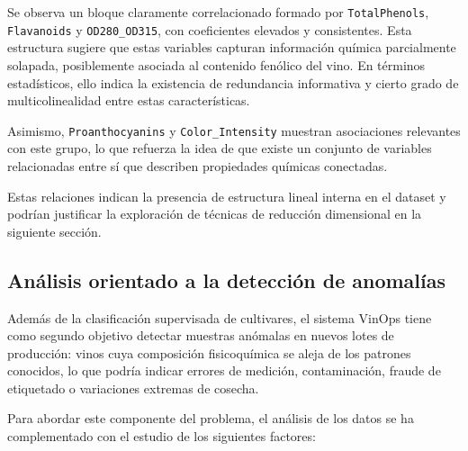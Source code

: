Se observa un bloque claramente correlacionado formado por 
\texttt{TotalPhenols}, \texttt{Flavanoids} y \texttt{OD280\_OD315}, 
con coeficientes elevados y consistentes. Esta estructura sugiere que 
estas variables capturan información química parcialmente solapada, 
posiblemente asociada al contenido fenólico del vino. En términos 
estadísticos, ello indica la existencia de redundancia informativa y 
cierto grado de multicolinealidad entre estas características.

Asimismo, \texttt{Proanthocyanins} y \texttt{Color\_Intensity} muestran 
asociaciones relevantes con este grupo, lo que refuerza la idea de que 
existe un conjunto de variables relacionadas entre sí que describen 
propiedades químicas conectadas. 

\vspace{1.5mm}

Estas relaciones indican la presencia de estructura lineal interna en
el dataset y podrían justificar la exploración de técnicas de reducción
dimensional en la siguiente sección.

\subsection{An\'alisis orientado a la detecci\'on de anomal\'ias}

    Adem\'as de la clasificaci\'on supervisada de cultivares, el sistema VinOps
    tiene como segundo objetivo detectar muestras an\'omalas en nuevos lotes de
    producci\'on: vinos cuya composici\'on fisicoqu\'imica se aleja
    de los patrones conocidos, lo que podr\'ia indicar errores de medici\'on, 
    contaminaci\'on, fraude de etiquetado o variaciones extremas de cosecha.

    Para abordar este componente del problema, el an\'alisis de los datos se ha
    complementado con el estudio de los siguientes factores:

